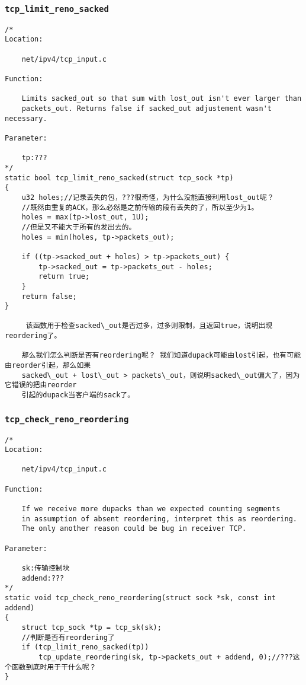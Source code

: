 		\subsubsection{\texttt{tcp_limit_reno_sacked}}
\begin{verbatim}
/* 
Location:

	net/ipv4/tcp_input.c

Function:

	Limits sacked_out so that sum with lost_out isn't ever larger than
	packets_out. Returns false if sacked_out adjustement wasn't necessary.

Parameter:

	tp:???
*/
static bool tcp_limit_reno_sacked(struct tcp_sock *tp)
{
	u32 holes;//记录丢失的包，???很奇怪，为什么没能直接利用lost_out呢？
	//既然由重复的ACK，那么必然是之前传输的段有丢失的了，所以至少为1。
	holes = max(tp->lost_out, 1U);
	//但是又不能大于所有的发出去的。
	holes = min(holes, tp->packets_out);

	if ((tp->sacked_out + holes) > tp->packets_out) {
		tp->sacked_out = tp->packets_out - holes;
		return true;
	}
	return false;
}

	 该函数用于检查sacked\_out是否过多，过多则限制，且返回true，说明出现reordering了。

	那么我们怎么判断是否有reordering呢？ 我们知道dupack可能由lost引起，也有可能由reorder引起，那么如果 
	sacked\_out + lost\_out > packets\_out，则说明sacked\_out偏大了，因为它错误的把由reorder 
	引起的dupack当客户端的sack了。
\end{verbatim}
		\subsubsection{\texttt{tcp_check_reno_reordering}}
\begin{verbatim}
/* 
Location:
	
	net/ipv4/tcp_input.c

Function:

	If we receive more dupacks than we expected counting segments
	in assumption of absent reordering, interpret this as reordering.
	The only another reason could be bug in receiver TCP.

Parameter:

	sk:传输控制块
	addend:???
*/
static void tcp_check_reno_reordering(struct sock *sk, const int addend)
{
	struct tcp_sock *tp = tcp_sk(sk);
	//判断是否有reordering了
	if (tcp_limit_reno_sacked(tp))
		tcp_update_reordering(sk, tp->packets_out + addend, 0);//???这个函数到底时用于干什么呢？
}
\end{verbatim}

